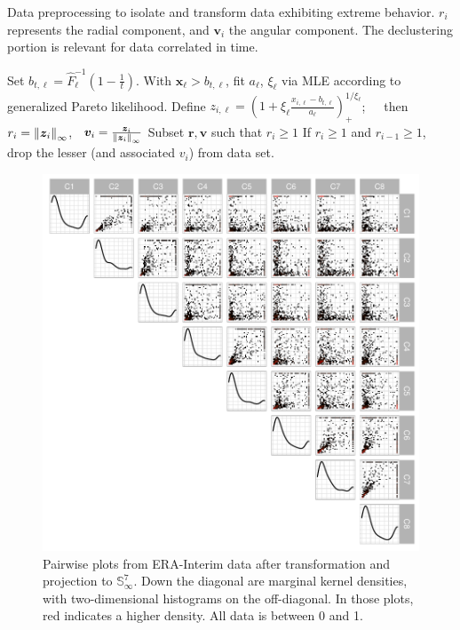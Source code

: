 \begin{algorithm}[htb]
    \caption{Data preprocessing to isolate and transform data exhibiting extreme behavior.  $r_i$
    represents the radial component, and $\bm{v}_i$ the angular component.  The declustering 
    portion is relevant for data correlated in time.\label{algo:processing}}
    \begin{algorithmic}
            \State Set $b_{t,\ell} = \hat{F}_{\ell}^{-1}\left(1 - \frac{1}{t}\right)$.
            \State With $\bm{ x}_{\ell} > b_{t,\ell}$, fit $a_{\ell}$, $\xi_{\ell}$ via MLE according to generalized Pareto likelihood.
        \EndFor
            \State Define $z_{i,\ell} = \left(1 + \xi_{\ell}\frac{x_{i,\ell} - b_{t,\ell}}{a_{\ell}}\right)_{+}^{1/\xi_{\ell}}$; $\;\;\;$ then $r_i = \pnorm{\bm{ z}_i}{\infty}$, $\;\;\bm{ v}_i = \frac{\bm{ z}_i}{\pnorm{\bm{ z}_i}{\infty}}$
        \EndFor
        \State Subset $\bm{ r},\bm{ v}$ such that $r_i \geq 1$
                \State If $r_i \geq 1$ and $r_{i-1} \geq 1$, drop the lesser (and associated $v_i$) from data set.
            \EndFor
        \EndIf
    \end{algorithmic}
\end{algorithm}


\begin{figure}[ht]%
    \centering
    \includegraphics[width=.7\linewidth]{./images/data_transformed}
    \caption{Pairwise plots from ERA-Interim data after transformation and projection to ${\mathbb S}_{\infty}^{7}$.  Down the diagonal are marginal kernel densities, with two-dimensional histograms on the off-diagonal.  In those plots, red indicates a higher density.  All data is between 0 and 1.\label{fig:erai_data}}
\end{figure}

